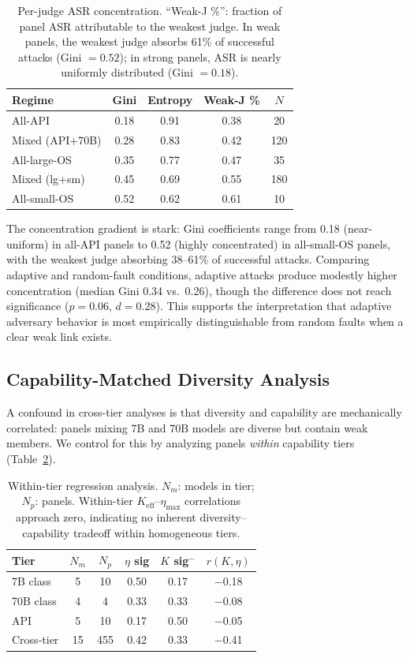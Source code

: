 \documentclass[11pt]{article}
\begin{document}
\begin{table}[t]
\centering
\small
\begin{tabular}{lcccc}
\toprule
\textbf{Regime} & \textbf{Gini} & \textbf{Entropy} & \textbf{Weak-J \%} & $N$ \\
\midrule
All-API & 0.18 & 0.91 & 0.38 & 20 \\
Mixed (API+70B) & 0.28 & 0.83 & 0.42 & 120 \\
All-large-OS & 0.35 & 0.77 & 0.47 & 35 \\
Mixed (lg+sm) & 0.45 & 0.69 & 0.55 & 180 \\
All-small-OS & 0.52 & 0.62 & 0.61 & 10 \\
\bottomrule
\end{tabular}
\caption{Per-judge ASR concentration. ``Weak-J \%'': fraction of panel ASR attributable to the weakest judge. In weak panels, the weakest judge absorbs 61\% of successful attacks (Gini $= 0.52$); in strong panels, ASR is nearly uniformly distributed (Gini $= 0.18$).}
\label{tab:concentration}
\end{table}

The concentration gradient is stark: Gini coefficients range from 0.18 (near-uniform) in all-API panels to 0.52 (highly concentrated) in all-small-OS panels, with the weakest judge absorbing 38--61\% of successful attacks.
Comparing adaptive and random-fault conditions, adaptive attacks produce modestly higher concentration (median Gini 0.34 vs.\ 0.26), though the difference does not reach significance ($p = 0.06$, $d = 0.28$).
This supports the interpretation that adaptive adversary behavior is most empirically distinguishable from random faults when a clear weak link exists.

\subsection{Capability-Matched Diversity Analysis}
\label{sec:capability_matched}

A confound in cross-tier analyses is that diversity and capability are mechanically correlated: panels mixing 7B and 70B models are diverse but contain weak members.
We control for this by analyzing panels \emph{within} capability tiers (Table~\ref{tab:within_tier}).

\begin{table}[t]
\centering
\small
\begin{tabular}{lccccc}
\toprule
\textbf{Tier} & $N_m$ & $N_p$ & $\eta$ sig & $K$ sig$^-$ & $r(K,\eta)$ \\
\midrule
7B class & 5 & 10 & 0.50 & 0.17 & $-$0.18 \\
70B class & 4 & 4 & 0.33 & 0.33 & $-$0.08 \\
API & 5 & 10 & 0.17 & 0.50 & $-$0.05 \\
Cross-tier & 15 & 455 & 0.42 & 0.33 & $-$0.41 \\
\bottomrule
\end{tabular}
\caption{Within-tier regression analysis. $N_m$: models in tier; $N_p$: panels. Within-tier $K_{\text{eff}}$--$\eta_{\max}$ correlations approach zero, indicating no inherent diversity--capability tradeoff within homogeneous tiers.}
\label{tab:within_tier}
\end{table}
\end{document}
